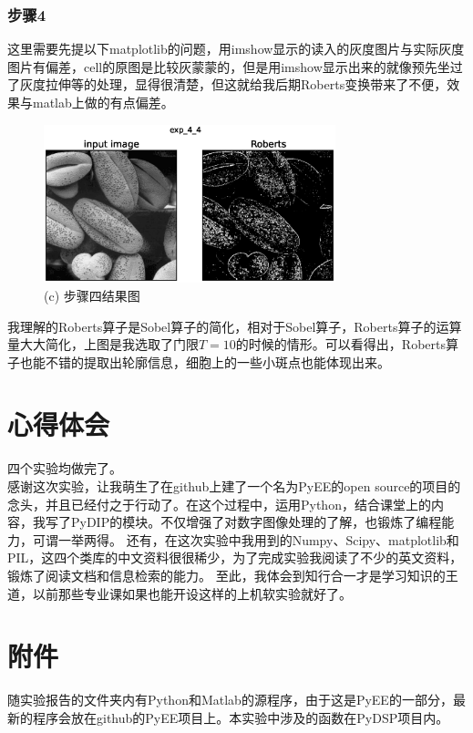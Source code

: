 \documentclass[]{IEEEphot}
\begin{document}
\subsubsection{步骤4}
这里需要先提以下matplotlib的问题，用imshow显示的读入的灰度图片与实际灰度图片有偏差，cell的原图是比较灰蒙蒙的，但是用imshow显示出来的就像预先坐过了灰度拉伸等的处理，显得很清楚，但这就给我后期Roberts变换带来了不便，效果与matlab上做的有点偏差。
\begin{figure}[h]
	\centering
	\includegraphics[width=20pc]{exp_4_4.eps}
	\caption{(c) 步骤四结果图}
	\label{fig_env1}
\end{figure}
我理解的Roberts算子是Sobel算子的简化，相对于Sobel算子，Roberts算子的运算量大大简化，上图是我选取了门限$T=10$的时候的情形。可以看得出，Roberts算子也能不错的提取出轮廓信息，细胞上的一些小斑点也能体现出来。
\section{心得体会}
四个实验均做完了。\\
感谢这次实验，让我萌生了在github上建了一个名为PyEE的open source的项目的念头，并且已经付之于行动了。在这个过程中，运用Python，结合课堂上的内容，我写了PyDIP的模块。不仅增强了对数字图像处理的了解，也锻炼了编程能力，可谓一举两得。
还有，在这次实验中我用到的Numpy、Scipy、matplotlib和PIL，这四个类库的中文资料很很稀少，为了完成实验我阅读了不少的英文资料，锻炼了阅读文档和信息检索的能力。
至此，我体会到知行合一才是学习知识的王道，以前那些专业课如果也能开设这样的上机软实验就好了。
\section{附件}
随实验报告的文件夹内有Python和Matlab的源程序，由于这是PyEE的一部分，最新的程序会放在github的PyEE项目上。本实验中涉及的函数在PyDSP项目内。
\end{document}
